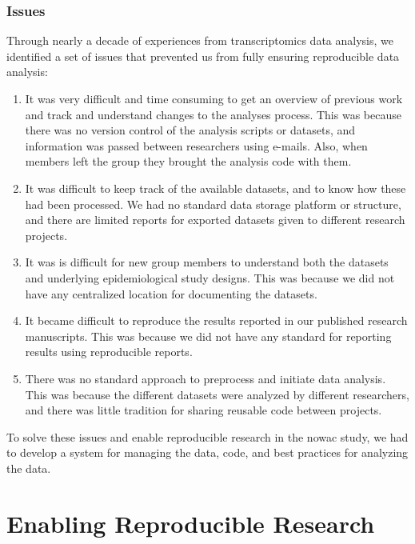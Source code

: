 \subsubsection{Issues}\label{issues} 
Through nearly a decade of experiences from transcriptomics data analysis, we
identified a set of issues that prevented us from fully ensuring reproducible
data analysis: 
\begin{enumerate} 
    \item 
        It was very difficult and time consuming to get an overview of previous
        work and track and understand changes to the analyses process. This was
        because there was no version control of the analysis scripts or
        datasets, and information was passed between researchers using e-mails.
        Also, when members left the group they brought the analysis code with
        them. 
    
    \item It was difficult to keep track of the available datasets, and to know
        how these had been processed. We had no standard data storage
        platform or structure, and there are limited reports for exported
        datasets given to different research projects.

    \item It was is difficult for new group members to understand both the
        datasets and underlying epidemiological study designs. This was because
        we did not have any centralized location for documenting the datasets.
    
    \item It became difficult to reproduce the results reported in our published
        research manuscripts. This was because we did not have any standard for
        reporting results using reproducible reports. 

    \item There was no standard approach to preprocess and initiate data
        analysis. This was because the different datasets were analyzed by
        different researchers, and there was little tradition for sharing
        reusable code between projects. 
        
\end{enumerate} 

To solve these issues and enable reproducible research in the \gls{nowac} study,
we had to develop a system for managing the data, code, and best practices for
analyzing the data. 


\section{Enabling Reproducible Research} 

